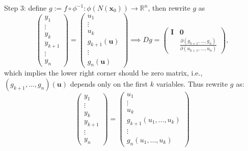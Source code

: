 Step 3: define $g:=f\circ \phi^{-1}: \phi(N(\bm x_0))\to\mathbb{R}^n$, then rewrite $g$ as
\[
\begin{pmatrix}
y_1\\\vdots\\y_k\\y_{k+1}\\\vdots\\y_n
\end{pmatrix}
=
\begin{pmatrix}
u_1\\\vdots\\u_k\\g_{k+1}(\bm u)\\\vdots\\g_n(\bm u)
\end{pmatrix}
\implies
Dg=\begin{pmatrix}
\bm I&\bm0\\
&\frac{\partial (g_{k+1},\dots,g_n)}{\partial(u_{k+1},\dots,u_n)}
\end{pmatrix},
\]
which implies the lower right corner should be zero matrix, i.e., $(g_{k+1},\dots,g_n)(\bm u)$ depends only on the first $k$ variables. Thus rewrite $g$ as:
\[
\begin{pmatrix}
y_1\\\vdots\\y_k\\y_{k+1}\\\vdots\\y_n
\end{pmatrix}
=
\begin{pmatrix}
u_1\\\vdots\\u_k\\g_{k+1}(u_1,\dots,u_k)\\\vdots\\g_n(u_1,\dots,u_k)
\end{pmatrix}
\]

